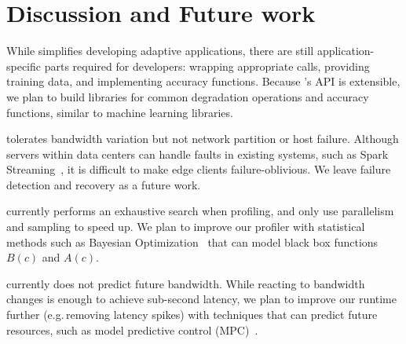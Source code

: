 \section{Discussion and Future work}
\label{sec:discussion}

 While \sysname{} simplifies developing
adaptive applications, there are still application-specific parts required for
developers: wrapping appropriate \maybe{} calls, providing training data, and
implementing accuracy functions. Because \sysname{}'s API is extensible, we plan
to build libraries for common degradation operations and accuracy functions,
similar to machine learning libraries.

 \sysname{} tolerates bandwidth variation
but not network partition or host failure. Although servers within data centers
can handle faults in existing systems, such as Spark
Streaming~\cite{zaharia2013discretized}, it is difficult to make edge clients
failure-oblivious.  We leave failure detection and recovery as a future work.

 \sysname{} currently performs an exhaustive search when
profiling, and only use parallelism and sampling to speed up. We plan to improve
our profiler with statistical methods such as Bayesian
Optimization~\cite{snoek2012practical, alipourfard2017cherrypick} that can model
black box functions $B(c)$ and $A(c)$.



 \sysname{} currently does not predict
future bandwidth. While reacting to bandwidth changes is enough to achieve
sub-second latency, we plan to improve our runtime further (e.g.\,removing
latency spikes) with techniques that can predict future resources, such as model
predictive control (MPC)~\cite{camacho2013model, yin2015control}.


